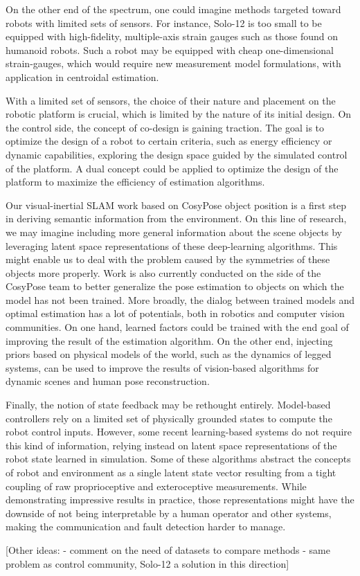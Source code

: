 On the other end of the spectrum, one could imagine methods targeted toward robots with limited sets of sensors. For instance, Solo-12 is too small to be 
equipped with high-fidelity, multiple-axis strain gauges such as those found on humanoid robots. Such a robot may be equipped with cheap
one-dimensional strain-gauges, which would require new measurement model formulations, with application in centroidal estimation.

With a limited set of sensors, the choice of their nature and placement on the robotic platform is crucial, which is limited by the nature of its initial design. 
On the control side, the concept of co-design is gaining traction. The goal is
to optimize the design of a robot to certain criteria, such as energy efficiency or dynamic capabilities, exploring the design space guided by 
the simulated control of the platform. A dual concept could be applied to optimize the design of the platform to maximize the efficiency of estimation algorithms.

Our visual-inertial SLAM work based on CosyPose object position is a first step in deriving semantic information from the environment. On this line of research, we may imagine
including more general information about the scene objects by leveraging latent space representations of these deep-learning algorithms. This might enable us to deal with the problem
caused by the symmetries of these objects more properly. Work is also currently conducted on the side of the CosyPose team to better generalize the pose estimation to objects on which the 
model has not been trained. More broadly, the dialog between trained models and optimal estimation has a lot of potentials, both in robotics
and computer vision communities. On one hand, learned factors could be trained with the end goal of improving the result of the estimation algorithm. On the other end,
injecting priors based on physical models of the world, such as the dynamics of legged systems, can be used to improve the results of vision-based algorithms
for dynamic scenes and human pose reconstruction.


Finally, the notion of state feedback may be rethought entirely. Model-based controllers rely on a limited set of physically grounded states to compute the robot control inputs. 
However, some recent learning-based systems do not require this kind of information, relying instead on latent space representations of the robot state learned
in simulation. Some of these algorithms abstract the concepts of robot and environment as a single latent state vector resulting from a tight coupling of raw proprioceptive and exteroceptive
measurements. While demonstrating impressive results in practice, those representations might have the downside of not being interpretable by a human operator and other systems, 
making the communication and fault detection harder to manage.  

[Other ideas:
- comment on the need of datasets to compare methods
- same problem as control community, Solo-12 a solution in this direction]
